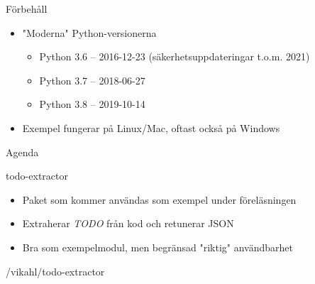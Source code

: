 \begin{frame}{Förbehåll}
  \begin{itemize}
    \item "Moderna" Python-versionerna
      \begin{itemize}
        \item Python 3.6 -- 2016-12-23 (säkerhetsuppdateringar t.o.m. 2021)
        \item Python 3.7 -- 2018-06-27
        \item Python 3.8 -- 2019-10-14
      \end{itemize}
    \item Exempel fungerar på Linux/Mac, oftast också på Windows
  \end{itemize}
\end{frame}


\begin{frame}{Agenda}
  \setcounter{tocdepth}{1}
  \tableofcontents
\end{frame}

\begin{frame}{todo-extractor}
  \begin{itemize}
    \item Paket som kommer användas som exempel under föreläsningen
    \item Extraherar \textit{TODO} från kod och retunerar JSON
    \item Bra som exempelmodul, men begränsad "riktig" användbarhet
  \end{itemize}

  /vikahl/todo-extractor

\end{frame}
